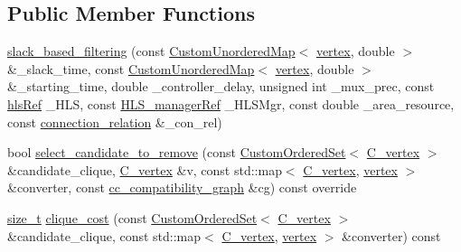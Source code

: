 \subsection*{Public Member Functions}
\begin{DoxyCompactItemize}
\item 
\hyperlink{structslack__based__filtering_a88749de7f8fc5a3383f9b8e7347498e4}{slack\+\_\+based\+\_\+filtering} (const \hyperlink{custom__map_8hpp_ad1ed68f2ff093683ab1a33522b144adc}{Custom\+Unordered\+Map}$<$ \hyperlink{graph_8hpp_abefdcf0544e601805af44eca032cca14}{vertex}, double $>$ \&\+\_\+slack\+\_\+time, const \hyperlink{custom__map_8hpp_ad1ed68f2ff093683ab1a33522b144adc}{Custom\+Unordered\+Map}$<$ \hyperlink{graph_8hpp_abefdcf0544e601805af44eca032cca14}{vertex}, double $>$ \&\+\_\+starting\+\_\+time, double \+\_\+controller\+\_\+delay, unsigned int \+\_\+mux\+\_\+prec, const \hyperlink{hls_8hpp_a75d0c73923d0ddfa28c4843a802c73a7}{hls\+Ref} \+\_\+\+H\+LS, const \hyperlink{hls__manager_8hpp_acd3842b8589fe52c08fc0b2fcc813bfe}{H\+L\+S\+\_\+manager\+Ref} \+\_\+\+H\+L\+S\+Mgr, const double \+\_\+area\+\_\+resource, const \hyperlink{cdfc__module__binding_8hpp_add937cbd74df34342adc0bb9231809a8}{connection\+\_\+relation} \&\+\_\+con\+\_\+rel)
\item 
bool \hyperlink{structslack__based__filtering_aae278a39030283f377963834005d2ed0}{select\+\_\+candidate\+\_\+to\+\_\+remove} (const \hyperlink{classCustomOrderedSet}{Custom\+Ordered\+Set}$<$ \hyperlink{clique__covering__graph_8hpp_a9cb45047ea8c5ed95a8cfa90494345aa}{C\+\_\+vertex} $>$ \&candidate\+\_\+clique, \hyperlink{clique__covering__graph_8hpp_a9cb45047ea8c5ed95a8cfa90494345aa}{C\+\_\+vertex} \&v, const std\+::map$<$ \hyperlink{clique__covering__graph_8hpp_a9cb45047ea8c5ed95a8cfa90494345aa}{C\+\_\+vertex}, \hyperlink{graph_8hpp_abefdcf0544e601805af44eca032cca14}{vertex} $>$ \&converter, const \hyperlink{clique__covering__graph_8hpp_aa88e9419fe776ef37020cacd507cc4ad}{cc\+\_\+compatibility\+\_\+graph} \&cg) const override
\item 
\hyperlink{tutorial__fpt__2017_2intro_2sixth_2test_8c_a7c94ea6f8948649f8d181ae55911eeaf}{size\+\_\+t} \hyperlink{structslack__based__filtering_ab0e7478f290e25d2bb830056c0f35b71}{clique\+\_\+cost} (const \hyperlink{classCustomOrderedSet}{Custom\+Ordered\+Set}$<$ \hyperlink{clique__covering__graph_8hpp_a9cb45047ea8c5ed95a8cfa90494345aa}{C\+\_\+vertex} $>$ \&candidate\+\_\+clique, const std\+::map$<$ \hyperlink{clique__covering__graph_8hpp_a9cb45047ea8c5ed95a8cfa90494345aa}{C\+\_\+vertex}, \hyperlink{graph_8hpp_abefdcf0544e601805af44eca032cca14}{vertex} $>$ \&converter) const
\end{DoxyCompactItemize}
